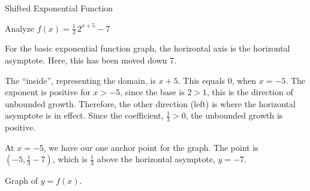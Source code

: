\documentclass{ximera}
\begin{document}
\begin{example}  Shifted Exponential Function



Analyze   $f(x) = \frac{1}{3} \, 2^{x+5} - 7$ \\


\begin{explanation}

For the basic exponential function graph, the horizontal axis is the horizontal asymptote.  Here, this has been moved down $7$.



The ``inside'', representing the domain, is $x+5$.  This equals $0$, when $x=-5$.  The exponent is positive for $x>-5$, since the base is $2 > 1$, this is the direction of unbounded growth.  Therefore, the other direction (left) is where the horizontal asymptote is in effect.  Since the coefficient, $\frac{1}{3} > 0$, the unbounded growth is positive.

At $x=-5$, we have our one anchor point for the graph.  The point is $\left(-5, \frac{1}{3} - 7 \right)$, which is $\frac{1}{3}$ above the horizontal asymptote, $y = -7$.


Graph of $y = f(x)$.

\begin{image}
\end{image}





\end{explanation}
\end{example}
\end{document}
